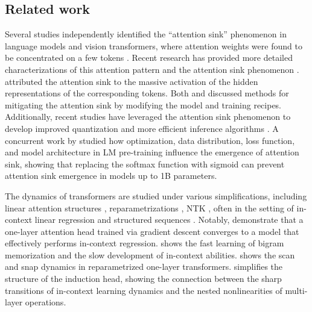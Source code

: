 \subsection{Related work}
Several studies independently identified the ``attention sink'' phenomenon in language models and vision transformers,  where attention weights were found to be concentrated on a few tokens \citep{xiao2023efficient, darcet2023vision, han2023lm, zhai2023stabilizing, elhage2023privileged, dettmers2022gpt3}. Recent research has provided more detailed characterizations of this attention pattern and the attention sink phenomenon \citep{fu2024attentionpattern, sun2024massive}. \citet{sun2024massive} attributed the attention sink to the massive activation of the hidden representations of the corresponding tokens. Both \citet{sun2024massive} and \citet{zhai2023stabilizing} discussed methods for mitigating the attention sink by modifying the model and training recipes. Additionally, recent studies have leveraged the attention sink phenomenon to develop improved quantization and more efficient inference algorithms \citep{liu2024intactkv, chen2024image, yu2024unveiling, son2024prefixing, lin2024duquant, bondarenko2023quantizable, hu2024outlier}. A concurrent work by \citet{gu2024attention} studied how optimization, data distribution, loss function, and model architecture in LM pre-training influence the emergence of attention sink, showing that replacing the softmax function with sigmoid can prevent attention sink emergence in models up to 1B parameters.

The dynamics of transformers are studied under various simplifications, including linear attention structures \citep{zhang2023trained,ahn2024transformers}, reparametrizations \citep{tian2023joma}, NTK \citep{deora2023optimization}, often in the setting of in-context linear regression \citep{ahn2023linear,wu2023many,zhang2024context} and structured sequences \citep{bietti2024birth,nichani2024transformers,tian2023scan}. Notably, \citet{zhang2023trained, huang2023context, kim2024transformers} demonstrate that a one-layer attention head trained via gradient descent converges to a model that effectively performs in-context regression. \cite{bietti2024birth} shows the fast learning of bigram memorization and the slow development of in-context abilities. \cite{tian2023scan} shows the scan and snap dynamics in reparametrized one-layer transformers. \cite{reddy2023mechanistic} simplifies the structure of the induction head, showing the connection between the sharp transitions of in-context learning dynamics and the nested nonlinearities of multi-layer operations.

